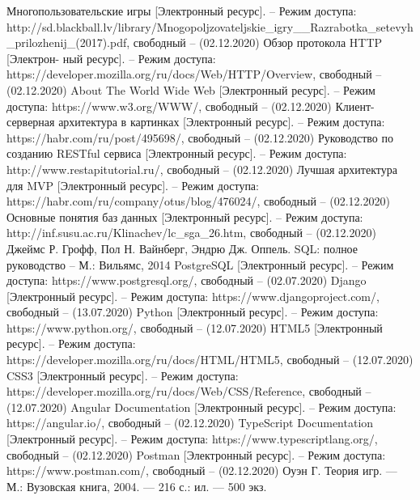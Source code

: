 \documentclass[a4paper,14pt]{extarticle}
\begin{document}
 	\begin{thebibliography}{5}
 		Многопользовательские игры [Электронный ресурс]. – Режим доступа: 
 		http://sd.blackball.lv/library/Mnogopoljzovateljskie\_igry\_\_Razrabotka\_setevyh\_prilozhenij\_(2017).pdf, 
 		свободный – (02.12.2020)
 		Обзор протокола HTTP [Электрон- ный ресурс]. – Режим доступа: https://developer.mozilla.org/ru/docs/Web/HTTP/Overview, свободный – (02.12.2020)
 		About The World Wide Web [Электронный ресурс]. – Режим доступа: https://www.w3.org/WWW/, свободный – (02.12.2020)
 		Клиент-серверная архитектура в картинках [Электронный ресурс]. – Режим доступа: https://habr.com/ru/post/495698/, свободный – (02.12.2020)
 		Руководство по созданию RESTful сервиса [Электронный ресурс]. – Режим доступа: http://www.restapitutorial.ru/, свободный – (02.12.2020)
 		Лучшая архитектура для MVP [Электронный ресурс]. – Режим доступа: https://habr.com/ru/company/otus/blog/476024/, свободный – (02.12.2020)
 		Основные понятия баз данных [Электронный ресурс]. – Режим доступа: http://inf.susu.ac.ru/Klinachev/lc\_sga\_26.htm, свободный – (02.12.2020)
 		Джеймс Р. Грофф, Пол Н. Вайнберг, Эндрю Дж. Оппель. SQL: полное руководство – М.: Вильямс, 2014
 		PostgreSQL [Электронный ресурс]. – Режим доступа: 
 		https://www.postgresql.org/, 
 		свободный – (02.07.2020)
 		Django [Электронный ресурс]. – Режим доступа: 
 		https://www.djangoproject.com/, 
 		свободный – (13.07.2020)
 		Python [Электронный ресурс]. – Режим доступа: 
 		https://www.python.org/, 
 		свободный – (12.07.2020)
 		HTML5 [Электронный ресурс]. – Режим доступа: 
 		https://developer.mozilla.org/ru/docs/HTML/HTML5, 
 		свободный – (12.07.2020)
 		CSS3 [Электронный ресурс]. – Режим доступа: 
 		https://developer.mozilla.org/ru/docs/Web/CSS/Reference, 
 		свободный – (12.07.2020)
 		Angular Documentation [Электронный ресурс]. – Режим доступа: https://angular.io/, свободный – (02.12.2020)
 		TypeScript Documentation [Электронный ресурс]. – Режим доступа: https://www.typescriptlang.org/, свободный – (02.12.2020)
 		Postman [Электронный ресурс]. – Режим доступа: https://www.postman.com/, свободный – (02.12.2020)
 		Оуэн Г. Теория игр. — М.: Вузовская книга, 2004. — 216 с.: ил. — 500 экз. 
 	\end{thebibliography}
 
\end{document}
